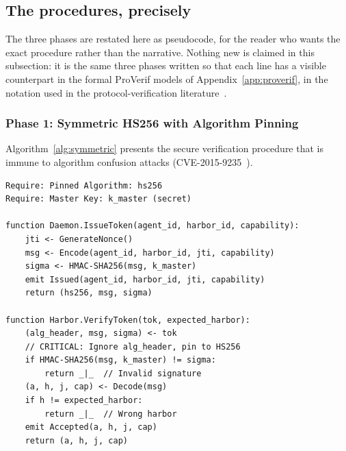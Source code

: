 \documentclass[11pt,a4paper]{article}
\theoremstyle{definition}
\begin{document}
\subsection{The procedures, precisely}\label{sec:algorithms}

The three phases are restated here as pseudocode, for the reader who wants the exact procedure rather than the narrative. Nothing new is claimed in this subsection: it is the same three phases written so that each line has a visible counterpart in the formal ProVerif models of Appendix~\ref{app:proverif}, in the notation used in the protocol-verification literature~.

\subsubsection{Phase 1: Symmetric HS256 with Algorithm Pinning}

Algorithm~\ref{alg:symmetric} presents the secure verification procedure that is immune to algorithm confusion attacks (CVE-2015-9235~).

\begin{lstlisting}[caption={Algorithm 1: Secure Harbor Verification (HS256 with Algorithm Pinning)},label={alg:symmetric}]
Require: Pinned Algorithm: hs256
Require: Master Key: k_master (secret)

function Daemon.IssueToken(agent_id, harbor_id, capability):
    jti <- GenerateNonce()
    msg <- Encode(agent_id, harbor_id, jti, capability)
    sigma <- HMAC-SHA256(msg, k_master)
    emit Issued(agent_id, harbor_id, jti, capability)
    return (hs256, msg, sigma)

function Harbor.VerifyToken(tok, expected_harbor):
    (alg_header, msg, sigma) <- tok
    // CRITICAL: Ignore alg_header, pin to HS256
    if HMAC-SHA256(msg, k_master) != sigma:
        return _|_  // Invalid signature
    (a, h, j, cap) <- Decode(msg)
    if h != expected_harbor:
        return _|_  // Wrong harbor
    emit Accepted(a, h, j, cap)
    return (a, h, j, cap)
\end{lstlisting}
\end{document}
